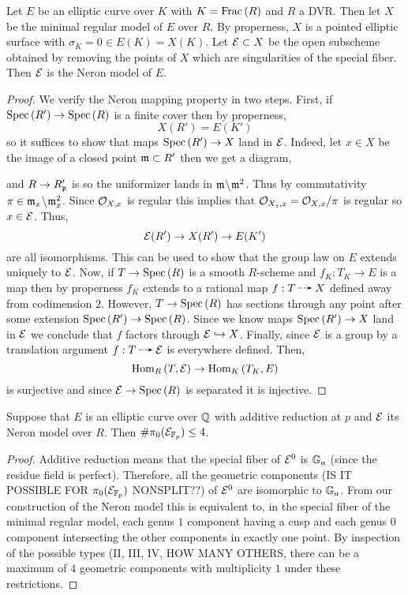 \documentclass[12pt]{article}
\begin{document}
\begin{prop}
Let $E$ be an elliptic curve over $K$ with $K = \mathrm{Frac}\left(R\right)$ and $R$ a DVR. Then let $X$ be the minimal regular model of $E$ over $R$. By properness, $X$ is a pointed elliptic surface with $\sigma_K = 0 \in E(K) = X(K)$. Let $\mathcal{E} \subset X$ be the open subscheme obtained by removing the points of $X$ which are singularities of the special fiber. Then $\mathcal{E}$ is the Neron model of $E$.
\end{prop}

\begin{proof}
We verify the Neron mapping property in two steps. First, if $\mathrm{Spec}\left( R' \right) \to \mathrm{Spec}\left( R \right)$ is a finite \etale cover then by properness,
\[ X(R') = E(K') \]
so it suffices to show that maps $\mathrm{Spec}\left( R' \right) \to X$ land in $\mathcal{E}$. Indeed, let $x \in X$ be the image of a closed point $\mathfrak{m} \subset R'$ then we get a diagram,
\begin{center}
\end{center} 
and $R \to R'_{\mathfrak{p}}$ is \etale so the uniformizer lands in $\mathfrak{m} \! \setminus \! \mathfrak{m}^2$. Thus by commutativity $\pi \in \mathfrak{m}_x \! \setminus \! \mathfrak{m}_x^2$. Since $\mathcal{O}_{X, x}$ is regular this implies that $\mathcal{O}_{X_s, x} = \mathcal{O}_{X, x} / \pi$ is regular so $x \in \mathcal{E}$. Thus,
\[ \mathcal{E}(R') \to X(R') \to E(K') \]
are all isomorphisms. This can be used to show that the group law on $E$ extends uniquely to $\mathcal{E}$. Now, if $T \to \mathrm{Spec}\left( R \right)$ is a smooth $R$-scheme and $f_K : T_K \to E$ is a map then by properness $f_K$ extends to a rational map $f : T \rat X$ defined away from codimension $2$. However, $T \to \mathrm{Spec}\left( R \right)$ has sections through any point after some \etale extension $\mathrm{Spec}\left( R' \right) \to \mathrm{Spec}\left( R \right)$. Since we know maps $\mathrm{Spec}\left( R' \right) \to X$ land in $\mathcal{E}$ we conclude that $f$ factors through $\mathcal{E} \hookrightarrow X$. Finally, since $\mathcal{E}$ is a group by a translation argument $f : T \rat \E$ is everywhere defined. Then,
\[ \mathrm{Hom}_{R} \left( T, \mathcal{E} \right) \to \mathrm{Hom}_{K} \left( T_K, E \right) \]
is surjective and since $\mathcal{E} \to \mathrm{Spec}\left( R \right)$ is separated it is injective.
\end{proof}


\begin{lemma}
Suppose that $E$ is an elliptic curve over $\mathbb{Q}$ with additive reduction at $p$ and $\mathcal{E}$ its Neron model over $R$. Then $\# \pi_0(\mathcal{E}_{\mathbb{F}_p}) \le 4$.
\end{lemma}

\begin{proof}
Additive reduction means that the special fiber of $\mathcal{E}^0$ is ${\mathbb{G}_a}$ (since the residue field is perfect). Therefore, all the geometric components (IS IT POSSIBLE FOR $\pi_0(\mathcal{E}_{\mathbb{F}_p})$ NONSPLIT??) of $\mathcal{E}^0$ are isomorphic to ${\mathbb{G}_a}$. From our construction of the Neron model this is equivalent to, in the special fiber of the minimal regular model, each genus $1$ component having a cusp and each genus $0$ component intersecting the other components in exactly one point. By inspection of the possible types (II, III, IV, HOW MANY OTHERS, there can be a maximum of $4$ geometric components with multiplicity $1$ under these restrictions. 
\end{proof}
\end{document}
